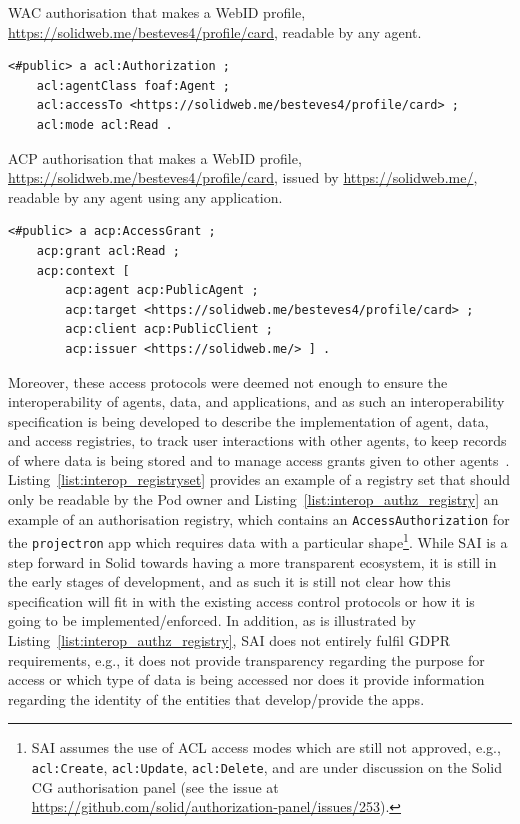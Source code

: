 \begin{listing}[ht]
\caption[WAC authorisation that makes a WebID profile, readable by any agent.]{WAC authorisation that makes a WebID profile, \url{https://solidweb.me/besteves4/profile/card}, readable by any agent.}
\label{list:wac}
\begin{verbatim}
<#public> a acl:Authorization ;
    acl:agentClass foaf:Agent ;
    acl:accessTo <https://solidweb.me/besteves4/profile/card> ;
    acl:mode acl:Read .
\end{verbatim}
\end{listing}

\begin{listing}[ht]
\caption[ACP authorisation that makes a WebID profile, issued by \url{https://solidweb.me/}, readable by any agent using any application.]{ACP authorisation that makes a WebID profile, \url{https://solidweb.me/besteves4/profile/card}, issued by \url{https://solidweb.me/}, readable by any agent using any application.}
\label{list:acp}
\begin{verbatim}
<#public> a acp:AccessGrant ;
    acp:grant acl:Read ;
    acp:context [
        acp:agent acp:PublicAgent ;
        acp:target <https://solidweb.me/besteves4/profile/card> ;
        acp:client acp:PublicClient ;
        acp:issuer <https://solidweb.me/> ] .
\end{verbatim}
\end{listing}

Moreover, these access protocols were deemed not enough to ensure the interoperability of agents, data, and applications, and as such an interoperability specification is being developed to describe the implementation of agent, data, and access registries, to track user interactions with other agents, to keep records of where data is being stored and to manage access grants given to other agents~\citep{bingham_interop_2023}.
Listing~\ref{list:interop_registryset} provides an example of a registry set that should only be readable by the Pod owner and Listing~\ref{list:interop_authz_registry} an example of an authorisation registry, which contains an \texttt{AccessAuthorization} for the \texttt{projectron} app which requires data with a particular shape\footnote{SAI assumes the use of ACL access modes which are still not approved, e.g., \texttt{acl:Create}, \texttt{acl:Update}, \texttt{acl:Delete}, and are under discussion on the Solid CG authorisation panel (see the issue at \url{https://github.com/solid/authorization-panel/issues/253}).}.
While SAI is a step forward in Solid towards having a more transparent ecosystem, it is still in the early stages of development, and as such it is still not clear how this specification will fit in with the existing access control protocols or how it is going to be implemented/enforced.
In addition, as is illustrated by Listing~\ref{list:interop_authz_registry}, SAI does not entirely fulfil GDPR requirements, e.g., it does not provide transparency regarding the purpose for access or which type of data is being accessed nor does it provide information regarding the identity of the entities that develop/provide the apps.

